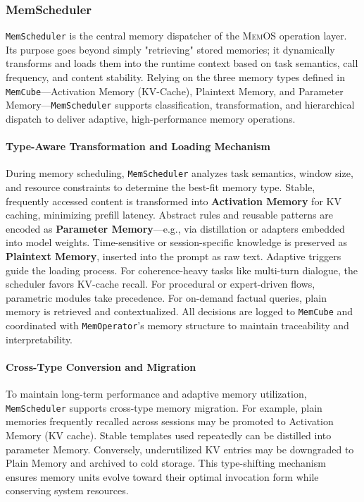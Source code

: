 \documentclass[]{memtensor}
\begin{document}
\subsubsection{MemScheduler}

\texttt{MemScheduler} is the central memory dispatcher of the \textsc{MemOS} operation layer. Its purpose goes beyond simply "retrieving" stored memories; it dynamically transforms and loads them into the runtime context based on task semantics, call frequency, and content stability.  
Relying on the three memory types defined in \texttt{MemCube}—Activation Memory (KV-Cache), Plaintext Memory, and Parameter Memory—\texttt{MemScheduler} supports classification, transformation, and hierarchical dispatch to deliver adaptive, high-performance memory operations.  

\paragraph{Type-Aware Transformation and Loading Mechanism}  

During memory scheduling, \texttt{MemScheduler} analyzes task semantics, window size, and resource constraints to determine the best-fit memory type.  
Stable, frequently accessed content is transformed into \textbf{Activation Memory} for KV caching, minimizing prefill latency.  
Abstract rules and reusable patterns are encoded as \textbf{Parameter Memory}—e.g., via distillation or adapters embedded into model weights.  
Time-sensitive or session-specific knowledge is preserved as \textbf{Plaintext Memory}, inserted into the prompt as raw text.  
Adaptive triggers guide the loading process.  
For coherence-heavy tasks like multi-turn dialogue, the scheduler favors KV-cache recall.  
For procedural or expert-driven flows, parametric modules take precedence.  
For on-demand factual queries, plain memory is retrieved and contextualized.  
All decisions are logged to \texttt{MemCube} and coordinated with \texttt{MemOperator}'s memory structure to maintain traceability and interpretability.  

\paragraph{Cross-Type Conversion and Migration}  
To maintain long-term performance and adaptive memory utilization, \texttt{MemScheduler} supports cross-type memory migration.  
For example, plain memories frequently recalled across sessions may be promoted to Activation Memory (KV cache).  
Stable templates used repeatedly can be distilled into parameter Memory.  
Conversely, underutilized KV entries may be downgraded to Plain Memory and archived to cold storage.  
This type-shifting mechanism ensures memory units evolve toward their optimal invocation form while conserving system resources.  
\end{document}
